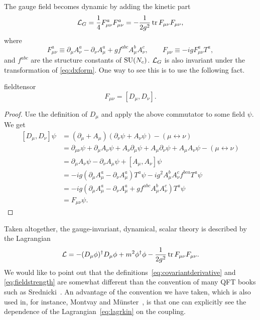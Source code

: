The gauge field becomes dynamic by adding the kinetic part
\begin{equation}\label{eq:lagrkin}
  \mathcal{L}_G=\frac{1}{4} F_{\mu\nu}^{a}F_{\mu\nu}^{a}
         =-\frac{1}{2g^2}\tr F_{\mu\nu}F_{\mu\nu},
\end{equation}
where 
\begin{equation}\label{eq:fieldstrength}
          F_{\mu\nu}^a\equiv \partial_\mu A_\nu^a-\partial_\nu A_\mu^a
                        +gf^{abc}A_\mu^b A_\nu^c,\qquad
  F_{\mu\nu}\equiv-igF_{\mu\nu}^aT^a,
\end{equation} 
and $f^{abc}$ are the structure constants of $\operatorname{SU}(N_c)$.
$\mathcal{L}_{G}$ is also invariant 
under the transformation of \eqref{eq:dxform}. One way to see this
is to use the following fact.
\begin{proposition}{}{fieldtensor}
  $$F_{\mu\nu}=\left[D_\mu,D_\nu\right].$$
  \begin{proof}
    Use the definition of $D_\mu$ and apply the above commutator to some
    field $\psi$. We get
    \begin{equation*}
    \begin{aligned}
      \left[D_\mu,D_\nu\right]\psi
         &=(\partial_\mu+A_\mu)(\partial_\nu\psi+A_\nu\psi)
                     -(\mu\leftrightarrow\nu)\\
         &=\partial_{\mu\nu}\psi+\partial_\mu A_\nu\psi
           +A_\nu\partial_\mu\psi+A_\mu\partial_\nu\psi
           +A_\mu A_\nu\psi-(\mu\leftrightarrow\nu)\\
         &=\partial_\mu A_\nu\psi-\partial_\nu A_\mu\psi
           +\left[A_\mu,A_\nu\right]\psi\\
         &=-ig\left(\partial_\mu A_\mu^a-\partial_\nu A_\mu^a\right)T^a\psi
           -ig^2A_\mu^bA_\nu^cf^{bca}T^a\psi\\
         &=-ig\left(\partial_\mu A_\mu^a-\partial_\nu A_\mu^a
                    +gf^{abc}A_\mu^bA_\nu^c\right)T^a\psi\\
         &=F_{\mu\nu}\psi.
    \end{aligned}
    \end{equation*}
  \end{proof}
\end{proposition}

Taken altogether, the gauge-invariant, dynamical, 
scalar theory is described by the Lagrangian
\begin{equation}
  \mathcal{L}=-(D_\mu\phi)^\dagger D_\mu\phi
                +m^2\phi^\dagger\phi
                -\frac{1}{2g^2}\tr F_{\mu\nu}F_{\mu\nu}.
\end{equation}
We would like
to point out that the definitions~\eqref{eq:covariantderivative} and
\eqref{eq:fieldstrength} are somewhat different than the convention
of many QFT books such as Srednicki~\cite{srednicki_quantum_2007}.
An advantage of the convention we have taken, which is also used in, 
for instance, Montvay and
M\"unster~\cite{montvay_quantum_1994}, is that one can explicitly see the
dependence of the Lagrangian~\eqref{eq:lagrkin} on the coupling. 

